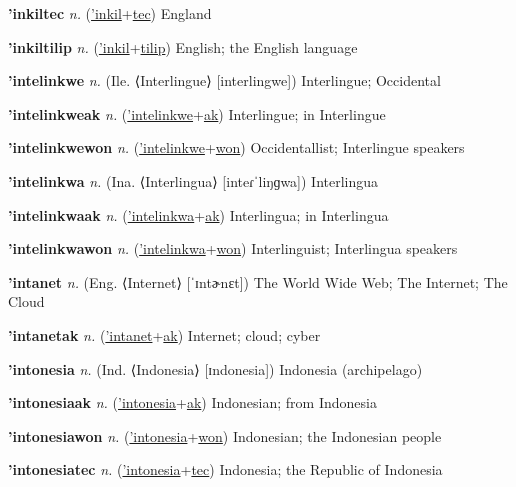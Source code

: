 \textbf{\hypertarget{'inkiltec}{'inkiltec}} \textit{n.} (\hyperlink{'inkil}{'inkil}+\allowbreak \hyperlink{tec}{tec})
England

\textbf{\hypertarget{'inkiltilip}{'inkiltilip}} \textit{n.} (\hyperlink{'inkil}{'inkil}+\allowbreak \hyperlink{tilip}{tilip})
English; the English language

\textbf{\hypertarget{'intelinkwe}{'intelinkwe}} \textit{n.} (Ile. ⟨Interlingue⟩ [interlingwe])
Interlingue; Occidental

\textbf{\hypertarget{'intelinkweak}{'intelinkweak}} \textit{n.} (\hyperlink{'intelinkwe}{'intelinkwe}+\allowbreak \hyperlink{ak}{ak})
Interlingue; in Interlingue

\textbf{\hypertarget{'intelinkwewon}{'intelinkwewon}} \textit{n.} (\hyperlink{'intelinkwe}{'intelinkwe}+\allowbreak \hyperlink{won}{won})
Occidentallist; Interlingue speakers

\textbf{\hypertarget{'intelinkwa}{'intelinkwa}} \textit{n.} (Ina. ⟨Interlingua⟩ [inteɾˈliŋɡwa])
Interlingua

\textbf{\hypertarget{'intelinkwaak}{'intelinkwaak}} \textit{n.} (\hyperlink{'intelinkwa}{'intelinkwa}+\allowbreak \hyperlink{ak}{ak})
Interlingua; in Interlingua

\textbf{\hypertarget{'intelinkwawon}{'intelinkwawon}} \textit{n.} (\hyperlink{'intelinkwa}{'intelinkwa}+\allowbreak \hyperlink{won}{won})
Interlinguist; Interlingua speakers

\textbf{\hypertarget{'intanet}{'intanet}} \textit{n.} (Eng. ⟨Internet⟩ [ˈɪntɚnɛt])
The World Wide Web; The Internet; The Cloud

\textbf{\hypertarget{'intanetak}{'intanetak}} \textit{n.} (\hyperlink{'intanet}{'intanet}+\allowbreak \hyperlink{ak}{ak})
Internet; cloud; cyber

\textbf{\hypertarget{'intonesia}{'intonesia}} \textit{n.} (Ind. ⟨Indonesia⟩ [ɪndonesia])
Indonesia (archipelago)

\textbf{\hypertarget{'intonesiaak}{'intonesiaak}} \textit{n.} (\hyperlink{'intonesia}{'intonesia}+\allowbreak \hyperlink{ak}{ak})
Indonesian; from Indonesia

\textbf{\hypertarget{'intonesiawon}{'intonesiawon}} \textit{n.} (\hyperlink{'intonesia}{'intonesia}+\allowbreak \hyperlink{won}{won})
Indonesian; the Indonesian people

\textbf{\hypertarget{'intonesiatec}{'intonesiatec}} \textit{n.} (\hyperlink{'intonesia}{'intonesia}+\allowbreak \hyperlink{tec}{tec})
Indonesia; the Republic of Indonesia

